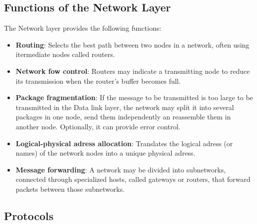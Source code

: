 %
%
%
%
%
%
%

\subsection{Functions of the Network Layer}
The Network layer provides the following functions:
\begin{itemize}
\item \textbf{Routing}: Selects the best path between two nodes in a network, often using itermediate nodes called routers.
\item \textbf{Network fow control}: Routers may indicate a transmitting node to reduce its transmission when the router's buffer becomes full.
\item \textbf{Package fragmentation}: If the message to be transmitted is too large to be transmitted in the Data link layer, the network may split it into several packages in one node, send them independently an reassemble them in another node. Optionally, it can provide error control.
\item \textbf{Logical-physical adress allocation}: Translates the logical adress (or names) of the network nodes into a unique physical adress.
\item \textbf{Message forwarding}: A network may be divided into subnetworks, connected through specialized hosts, called gateways or routers, that forward packets between those subnetworks.
\end{itemize}
\subsection{Protocols}
